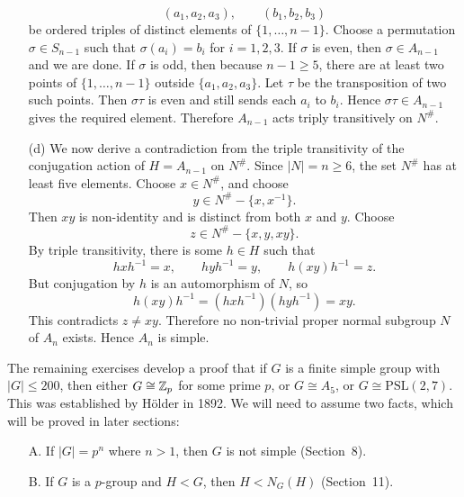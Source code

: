 \documentclass[../Odyssey_Project.tex]{subfiles}
\begin{document}
\begin{solution}
\begin{enumerate}
        \[
            (a_1,a_2,a_3),\qquad (b_1,b_2,b_3)
        \]
        be ordered triples of distinct elements of $\{1,\ldots,n-1\}$. Choose a permutation $\sigma\in S_{n-1}$ such that $\sigma(a_i)=b_i$ for $i=1,2,3$. If $\sigma$ is even, then $\sigma\in A_{n-1}$ and we are done. If $\sigma$ is odd, then because $n-1\geq 5$, there are at least two points of $\{1,\ldots,n-1\}$ outside $\{a_1,a_2,a_3\}$. Let $\tau$ be the transposition of two such points. Then $\sigma\tau$ is even and still sends each $a_i$ to $b_i$. Hence $\sigma\tau\in A_{n-1}$ gives the required element. Therefore $A_{n-1}$ acts triply transitively on $N^{\#}$.
        \item[(d)] We now derive a contradiction from the triple transitivity of the conjugation action of $H=A_{n-1}$ on $N^{\#}$. Since $|N|=n\geq 6$, the set $N^{\#}$ has at least five elements. Choose $x\in N^{\#}$, and choose
        \[
            y\in N^{\#}-\{x,x^{-1}\}.
        \]
        Then $xy$ is non-identity and is distinct from both $x$ and $y$. Choose
        \[
            z\in N^{\#}-\{x,y,xy\}.
        \]
        By triple transitivity, there is some $h\in H$ such that
        \[
            hxh^{-1}=x,\qquad hyh^{-1}=y,\qquad h(xy)h^{-1}=z.
        \]
        But conjugation by $h$ is an automorphism of $N$, so
        \[
            h(xy)h^{-1}=(hxh^{-1})(hyh^{-1})=xy.
        \]
        This contradicts $z\neq xy$. Therefore no non-trivial proper normal subgroup $N$ of $A_n$ exists. Hence $A_n$ is simple.
    \end{enumerate}
\end{solution}

\noindent The remaining exercises develop a proof that if $G$ is a finite simple group with $|G| \leq 200$, then either $G \cong \mathbb{Z}_p$ for some prime $p$, or $G \cong A_5$, or $G \cong \mathrm{PSL}(2, 7)$. This was established by H\"older in 1892. We will need to assume two facts, which will be proved in later sections:
\begin{itemize}
    \item[A.] If $|G| = p^n$ where $n > 1$, then $G$ is not simple (Section~8).
    \item[B.] If $G$ is a $p$-group and $H < G$, then $H < N_G(H)$ (Section~11).
\end{itemize}
\end{document}
